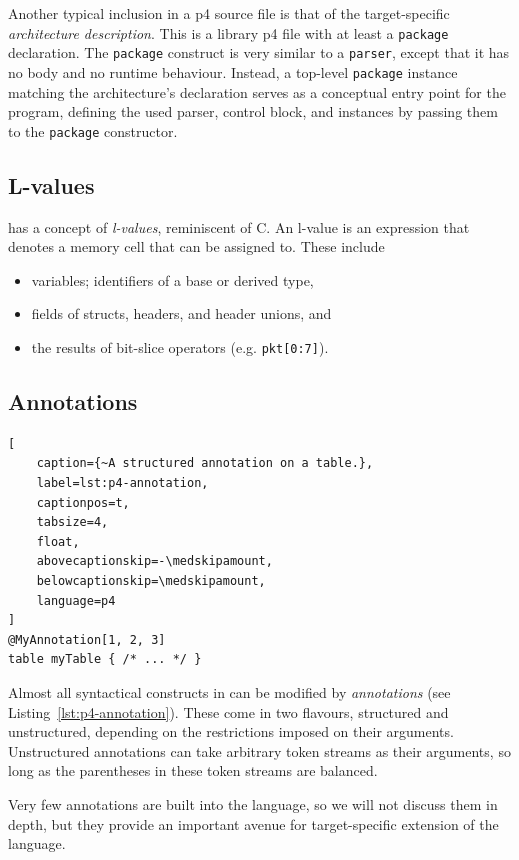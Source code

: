 Another typical inclusion in a \acrshort{p4} source file is that of the
target-specific \emph{architecture description}. This is a library \acrshort{p4}
file with at least a \texttt{package} declaration. The \texttt{package}
construct is very similar to a \texttt{parser}, except that it has no body and
no runtime behaviour. Instead, a top-level \texttt{package} instance matching
the architecture's declaration serves as a conceptual entry point for the
program, defining the used parser, control block, and \extern{} instances by
passing them to the \texttt{package} constructor.

\subsection*{L-values}

\pfs has a concept of \emph{l-values}, reminiscent of C. An l-value is an
expression that denotes a memory cell that can be assigned to. These include

\begin{itemize}
	\item variables; identifiers of a base or derived type,
	\item fields of structs, headers, and header unions, and
	\item the results of bit-slice operators (e.g. \texttt{pkt[0:7]}).
\end{itemize}

\subsection*{Annotations}

\begin{lstlisting}[
	caption={~A structured annotation on a table.},
	label=lst:p4-annotation,
	captionpos=t,
	tabsize=4,
	float,
	abovecaptionskip=-\medskipamount,
	belowcaptionskip=\medskipamount,
	language=p4
]
@MyAnnotation[1, 2, 3]
table myTable { /* ... */ }
\end{lstlisting}

Almost all syntactical constructs in \pfs can be modified by \emph{annotations}
(see Listing~\ref{lst:p4-annotation}). These come in two flavours, structured
and unstructured, depending on the restrictions imposed on their arguments.
Unstructured annotations can take arbitrary token streams as their arguments, so
long as the parentheses in these token streams are balanced.

Very few annotations are built into the language, so we will not discuss them in
depth, but they provide an important avenue for target-specific extension of the
language.


